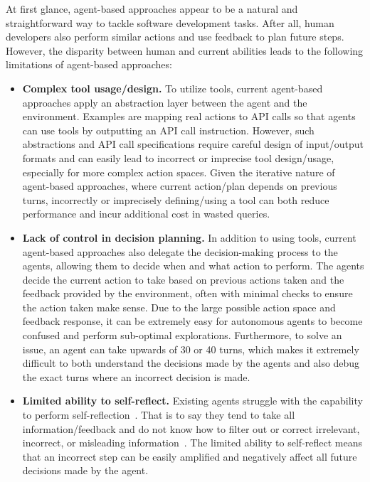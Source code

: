 At first glance, agent-based approaches appear to be a natural and straightforward way to tackle software development tasks. 
After all, human developers also perform similar actions and use feedback to plan future steps. 
However, the disparity between human and current \llm abilities leads to the following limitations of agent-based approaches:



\begin{itemize}[noitemsep, leftmargin=*, topsep=0pt]
    \item \textbf{Complex tool usage/design.}
    To utilize tools, current agent-based approaches apply an abstraction layer between the agent and the environment. 
    Examples are mapping real actions to API calls so that agents can use tools by outputting an API call instruction.
    However, such abstractions and API call specifications require careful design of input/output formats and can easily lead to incorrect or imprecise tool design/usage,
    especially for more complex action spaces. 
    Given the{ iterative} nature of agent-based approaches, where current action/plan depends on previous turns, incorrectly or imprecisely defining/using a tool can both reduce performance and incur additional cost in wasted \llm queries. 
    \item {\textbf{Lack of control in decision planning.}}
    In addition to using tools, current agent-based approaches also delegate the decision-making process to the agents{}, allowing them to decide when and what action to perform. 
    The agents decide the current action to take based on previous actions taken and the feedback provided by the environment, often with minimal checks to ensure the action taken make sense.
    Due to the large possible action space and feedback response, it can be extremely easy for autonomous agents to become confused and perform sub-optimal explorations.
    Furthermore, to solve an issue, an agent can take upwards of 30 or 40 turns, which makes it extremely difficult to both understand the decisions made by the agents and also debug the exact turns where an incorrect decision is made. 
    \item \textbf{Limited ability to self-reflect.}
    Existing agents struggle with the capability to perform self-reflection~\cite{olausson2023self, huang2024large}.
    That is to say they tend to take all information/feedback and do not know how to filter out or correct irrelevant, incorrect, or misleading information~\cite{shi2023large, zhang2023siren}. 
    The limited ability to self-reflect means that an incorrect step can be easily amplified and negatively affect all future decisions made by the agent.
    
\end{itemize}



